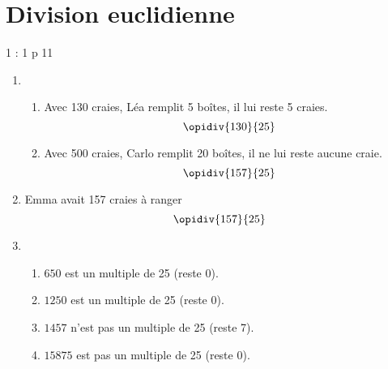 \documentclass[12pt,a4paper]{article}
\date{}
\title{}
\begin{document}




\section{Division euclidienne}

\begin{myact}{1 : 1 p 11}
	\begin{enumerate}
		\item  
		\begin{enumerate}[label=\alph*. ]
			\item Avec 130 craies, Léa remplit 5 boîtes, il lui reste 5 craies. %
			\begin{equation*}
				\opidiv{130}{25}
			\end{equation*}
			\item Avec 500 craies, Carlo remplit 20 boîtes, il ne lui reste aucune craie. %
				\begin{equation*}
					\opidiv{157}{25}
				\end{equation*}
		\end{enumerate}
		
		\item Emma avait 157 craies à ranger %
			\begin{equation*}
				\opidiv{157}{25}
			\end{equation*}
		
		\item \begin{enumerate}[label=\alph*. ]
			\item $650$ est un multiple de 25 (reste 0).
			\item $1250$ est un multiple de 25 (reste 0).
			\item $1457$ n'est pas un multiple de 25 (reste 7).
			\item $15875$ est pas un multiple de 25 (reste 0).
		\end{enumerate}
		
	\end{enumerate}
\end{myact}
\end{document}
